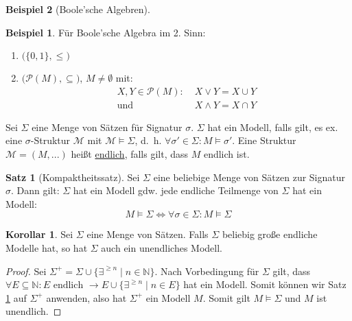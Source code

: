 \documentclass{article}
\theoremstyle{definition}
\newtheorem{satz}[dfn]{Satz}
\newtheorem{kor}[dfn]{Korollar}
\newtheorem*{bsp}{Beispiel}
\theoremstyle{plain}
\newcommand{\m}[1]{\mathcal{#1}}
\begin{document}
\begin{bsp}[Boole'sche Algebren]
        \begin{bsp}
            Für Boole'sche Algebra im 2. Sinn:
            \begin{enumerate}
                \item $ \big(\{0,1\}, \leq \big) $
                \item $ \big(\m{P}(M), \subseteq) $, $ M \not = \emptyset $ mit:
                \begin{align*}
                    X ,Y \in \m{P}(M): & \; X \lor Y = X \cup Y \\
                    \text{und } & \; X \land Y = X \cap Y
                \end{align*}
            \end{enumerate}
        \end{bsp}
    \end{bsp}

    Sei $ \Sigma $ eine Menge von Sätzen für Signatur $ \sigma $.
    $ \Sigma $ hat ein Modell, falls gilt, es ex. eine $ \sigma $-Struktur $ \m{M} $ mit $ \m{M} \models \Sigma $, d.~h. $ \forall \sigma' \in \Sigma: M \models \sigma' $.
    Eine Struktur $ \m{M} = (M,...) $ heißt \underline{endlich}, falls gilt, dass $ M $ endlich ist.

    \begin{satz}[Kompaktheitssatz]\label{satz:kompaktheitssatz}
        Sei $ \Sigma $ eine beliebige Menge von Sätzen zur Signatur $ \sigma $.
        Dann gilt: $ \Sigma $ hat ein Modell gdw. jede endliche Teilmenge von $ \Sigma $ hat ein Modell:
        \begin{equation*}
            M \models \Sigma \Leftrightarrow \forall \sigma \in \Sigma: M \models \Sigma
        \end{equation*}
    \end{satz}

    \begin{kor}\label{kor:unendliches-modell}
        Sei $ \Sigma $ eine Menge von Sätzen.
        Falls $ \Sigma $ beliebig große endliche Modelle hat, so hat $ \Sigma $ auch ein unendliches Modell.
    \end{kor}

    \begin{proof}
        Sei $ \Sigma^+ = \Sigma \cup \{ \exists^{\geq n} \mid n \in \mathbb{N} \} $.
        Nach Vorbedingung für $ \Sigma $ gilt, dass $ \forall E \subseteq \mathbb{N} : E \text{ endlich } \rightarrow E \cup \{ \exists^{\geq n} \mid n \in E \} $ hat ein Modell.
        Somit können wir Satz \ref{satz:kompaktheitssatz} auf $ \Sigma^+ $ anwenden, also hat $ \Sigma^+ $ ein Modell $ M $.
        Somit gilt $ M \models \Sigma $ und $ M $ ist unendlich.
    \end{proof}
\end{document}

